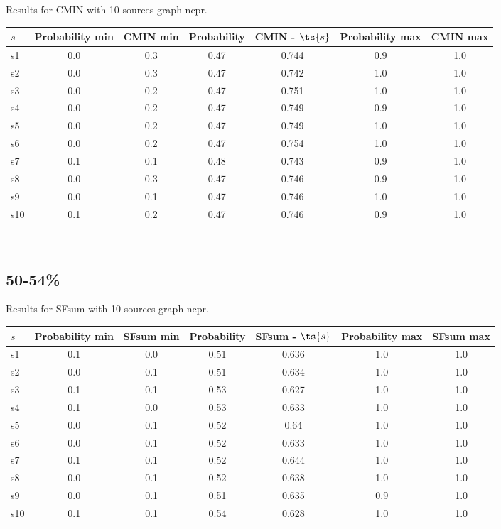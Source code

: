 \documentclass{article}
\begin{document}
\noindent Results for CMIN with 10 sources graph ncpr.

\noindent\begin{tabular}{|l|c|c|c|c|c|c|}
\hline
$s$& Probability min & CMIN min & Probability & CMIN - $\ts{s}$ & Probability max & CMIN max\\
\hline
s1 &0.0 & 0.3 & 0.47 & 0.744 & 0.9 & 1.0\\
\hline
s2 &0.0 & 0.3 & 0.47 & 0.742 & 1.0 & 1.0\\
\hline
s3 &0.0 & 0.2 & 0.47 & 0.751 & 1.0 & 1.0\\
\hline
s4 &0.0 & 0.2 & 0.47 & 0.749 & 0.9 & 1.0\\
\hline
s5 &0.0 & 0.2 & 0.47 & 0.749 & 1.0 & 1.0\\
\hline
s6 &0.0 & 0.2 & 0.47 & 0.754 & 1.0 & 1.0\\
\hline
s7 &0.1 & 0.1 & 0.48 & 0.743 & 0.9 & 1.0\\
\hline
s8 &0.0 & 0.3 & 0.47 & 0.746 & 0.9 & 1.0\\
\hline
s9 &0.0 & 0.1 & 0.47 & 0.746 & 1.0 & 1.0\\
\hline
s10 &0.1 & 0.2 & 0.47 & 0.746 & 0.9 & 1.0\\
\hline
\end{tabular}\\

\newpage

\subsection{50-54\%}

\noindent Results for SFsum with 10 sources graph ncpr.

\noindent\begin{tabular}{|l|c|c|c|c|c|c|}
\hline
$s$& Probability min & SFsum min & Probability & SFsum - $\ts{s}$ & Probability max & SFsum max\\
\hline
s1 &0.1 & 0.0 & 0.51 & 0.636 & 1.0 & 1.0\\
\hline
s2 &0.0 & 0.1 & 0.51 & 0.634 & 1.0 & 1.0\\
\hline
s3 &0.1 & 0.1 & 0.53 & 0.627 & 1.0 & 1.0\\
\hline
s4 &0.1 & 0.0 & 0.53 & 0.633 & 1.0 & 1.0\\
\hline
s5 &0.0 & 0.1 & 0.52 & 0.64 & 1.0 & 1.0\\
\hline
s6 &0.0 & 0.1 & 0.52 & 0.633 & 1.0 & 1.0\\
\hline
s7 &0.1 & 0.1 & 0.52 & 0.644 & 1.0 & 1.0\\
\hline
s8 &0.0 & 0.1 & 0.52 & 0.638 & 1.0 & 1.0\\
\hline
s9 &0.0 & 0.1 & 0.51 & 0.635 & 0.9 & 1.0\\
\hline
s10 &0.1 & 0.1 & 0.54 & 0.628 & 1.0 & 1.0\\
\hline
\end{tabular}\\
\end{document}
